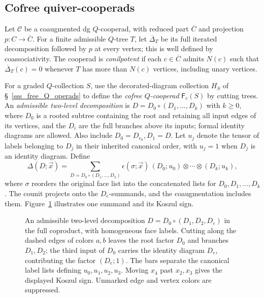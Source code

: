 \documentclass[11pt,letterpaper]{article}
\numberwithin{equation}{section}
\theoremstyle{plain}
\theoremstyle{definition}
\theoremstyle{remark}
\begin{document}
\subsection{Cofree quiver-cooperads}
\label{s_cofree}
Let $\mathscr C$ be a coaugmented dg $Q$-cooperad, with reduced
part $\overline C$ and projection $p:C\to\overline C$.
For a finite admissible $Q$-tree $T$, let $\overline\Delta_T$ be its full iterated decomposition followed by $p$ at every vertex; this is well defined by coassociativity. The cooperad is \textit{conilpotent} if each $c\in\overline C$ admits $N(c)$ such that $\overline\Delta_T(c)=0$ whenever $T$ has more than $N(c)$ vertices, including unary vertices.

For a graded $Q$-collection $S$, use the decorated-diagram collection
$H_S$ of \S~\ref{sss_free_Q_operads} to define the \textit{cofree $Q$-cooperad} $\mathsf F_c(S)$ by
cutting trees. An \textit{admissible two-level decomposition} is
$D=D_0\circ(D_1,\ldots,D_k)$ with $k\geq0$,
where $D_0$ is a rooted subtree containing the root and retaining all
input edges of its vertices, and the $D_i$ are
the full branches above its inputs; formal identity diagrams are allowed.
Also include $D_0=D_{e_0},D_1=D$. Let $u_j$ denote the tensor of labels
belonging to $D_j$ in their inherited canonical order, with $u_j=1$
when $D_j$ is an identity diagram. Define
\begin{equation}\label{eq_comult_full}
 \Delta(D;\vec x)=\sum_{D=D_0\circ(D_1,\ldots,D_k)}
 \epsilon(\sigma;\vec x)\,(D_0;u_0)\otimes\cdots\otimes(D_k;u_k),
\end{equation}
where $\sigma$ reorders the original face list into the concatenated
lists for $D_0,D_1,\ldots,D_k$. The counit projects onto the
$D_e$-summands, and the coaugmentation includes them.
Figure~\ref{fig:cofree-cooperad-decomposition} illustrates one summand
and its Koszul sign.

\begin{figure}[htbp]
\centering

\caption{An admissible two-level decomposition
$D=D_0\circ(D_1,D_2,D_e)$ in the full coproduct, with homogeneous
face labels. Cutting along the dashed edges of colors $a,b$ leaves
the root factor $D_0$ and branches $D_1,D_2$; the third input of $D_0$
carries the identity diagram $D_e$, contributing the factor $(D_e;1)$.
The bars separate the canonical label lists defining $u_0,u_1,u_2,u_3$.
Moving $x_4$ past $x_2,x_3$ gives the displayed Koszul sign.
Unmarked edge and vertex colors are suppressed.}
\label{fig:cofree-cooperad-decomposition}
\end{figure}
\end{document}
